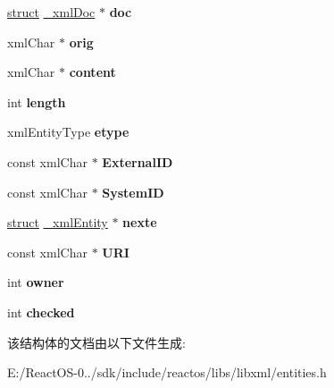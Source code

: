 \begin{DoxyCompactItemize}
\item 
\mbox{\label{struct__xml_entity_adfa8770d70ba762a556cc525b578232a}} 
\hyperlink{interfacestruct}{struct} \hyperlink{struct__xml_doc}{\+\_\+xml\+Doc} $\ast$ {\bfseries doc}
\item 
\mbox{\label{struct__xml_entity_a0d61b0e8cf6a2b5c5a93bba7de2c389a}} 
xml\+Char $\ast$ {\bfseries orig}
\item 
\mbox{\label{struct__xml_entity_a3a6e1d76537e03d0187f264e9c2cc6c5}} 
xml\+Char $\ast$ {\bfseries content}
\item 
\mbox{\label{struct__xml_entity_a2be272ed0fa826273581be4342e8c1aa}} 
int {\bfseries length}
\item 
\mbox{\label{struct__xml_entity_a7c77f01ae8584f35322960c9af2c44f1}} 
xml\+Entity\+Type {\bfseries etype}
\item 
\mbox{\label{struct__xml_entity_a88219df7a050603dace4d7927295550c}} 
const xml\+Char $\ast$ {\bfseries External\+ID}
\item 
\mbox{\label{struct__xml_entity_a151ac2dba106b8037c9c3caef0b3800e}} 
const xml\+Char $\ast$ {\bfseries System\+ID}
\item 
\mbox{\label{struct__xml_entity_a0e15a609099a953539fba75528f9a1aa}} 
\hyperlink{interfacestruct}{struct} \hyperlink{struct__xml_entity}{\+\_\+xml\+Entity} $\ast$ {\bfseries nexte}
\item 
\mbox{\label{struct__xml_entity_a5b15c128b50ab54749a65045966f50a5}} 
const xml\+Char $\ast$ {\bfseries U\+RI}
\item 
\mbox{\label{struct__xml_entity_ae649c00dd7685e9ec5cdc8e907fb62e7}} 
int {\bfseries owner}
\item 
\mbox{\label{struct__xml_entity_a8d02912e453726ef10dce4e48dd7ba78}} 
int {\bfseries checked}
\end{DoxyCompactItemize}


该结构体的文档由以下文件生成\+:\begin{DoxyCompactItemize}
\item 
E\+:/\+React\+O\+S-\/0../sdk/include/reactos/libs/libxml/entities.\+h\end{DoxyCompactItemize}
